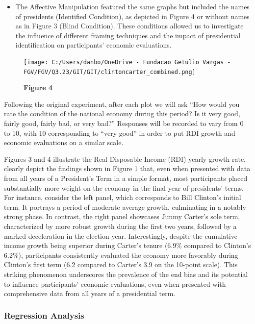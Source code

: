 \documentclass[
]{article}
\providecommand{\tightlist}{%
  \setlength{\itemsep}{0pt}\setlength{\parskip}{0pt}}
\begin{document}
\begin{itemize}
\tightlist
\item
  The Affective Manipulation featured the same graphs but included the
  names of presidents (Identified Condition), as depicted in Figure 4 or
  without names as in Figure 3 (Blind Condition). These conditions
  allowed us to investigate the influence of different framing
  techniques and the impact of presidential identification on
  participants' economic evaluations.
\end{itemize}

\begin{figure}
\centering
\texttt{[image: C:/Users/danbo/OneDrive - Fundacao Getulio Vargas - FGV/FGV/Q3.23/GIT/GIT/clintoncarter\_combined.png]}
\caption{\textbf{Figure 4}}
\end{figure}

Following the original experiment, after each plot we will ask ``How
would you rate the condition of the national economy during this period?
Is it very good, fairly good, fairly bad, or very bad?'' Responses will
be recorded to vary from 0 to 10, with 10 corresponding to ``very good''
in order to put RDI growth and economic evaluations on a similar scale.

Figures 3 and 4 illustrate the Real Disposable Income (RDI) yearly
growth rate, clearly depict the findings shown in Figure 1 that, even
when presented with data from all years of a President's Term in a
simple format, most participants placed substantially more weight on the
economy in the final year of presidents' terms. For instance, consider
the left panel, which corresponds to Bill Clinton's initial term. It
portrays a period of moderate average growth, culminating in a notably
strong phase. In contrast, the right panel showcases Jimmy Carter's sole
term, characterized by more robust growth during the first two years,
followed by a marked deceleration in the election year. Interestingly,
despite the cumulative income growth being superior during Carter's
tenure (6.9\% compared to Clinton's 6.2\%), participants consistently
evaluated the economy more favorably during Clinton's first term (6.2
compared to Carter's 3.9 on the 10-point scale). This striking
phenomenon underscores the prevalence of the end bias and its potential
to influence participants' economic evaluations, even when presented
with comprehensive data from all years of a presidential term.

\hypertarget{regression-analysis}{%
\subsubsection{Regression Analysis}\label{regression-analysis}}
\end{document}
